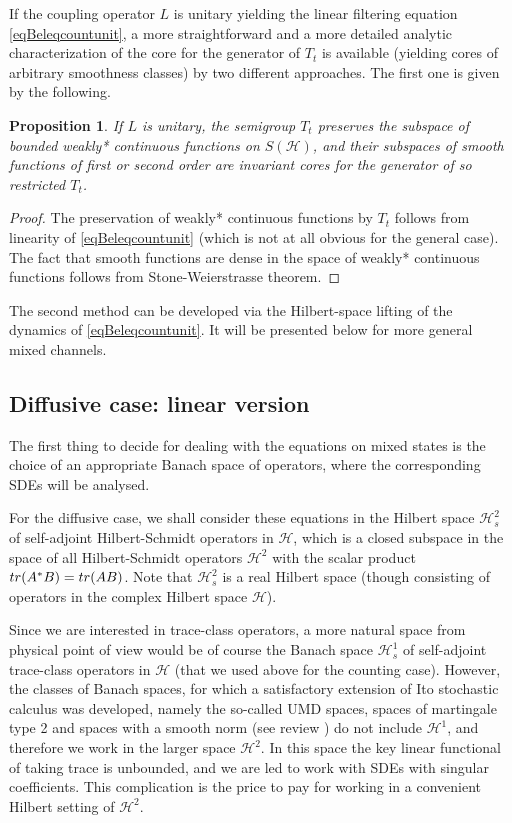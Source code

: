 \documentclass[10pt,a4paper]{amsart}
\def\HC{\mathcal{H}}
\def\tr{\rm{tr}}
\newtheorem{prop}{Proposition}[section]
\newtheorem{remark}{Remark}
\begin{document}
If the coupling operator $L$ is unitary yielding the linear filtering equation
\eqref{eqBeleqcountunit}, a more straightforward and a more detailed analytic
characterization of the core for the generator of $T_t$ is available (yielding
cores of arbitrary smoothness classes)
by two different approaches.
The first one is given by the following.

\begin{prop}
\label{JumpWellPDE2}
If $L$ is unitary, the semigroup  $T_t$ preserves the subspace of bounded weakly* continuous functions
on $S(\HC)$, and their subspaces of smooth functions of first or second order are invariant cores
for the generator of so restricted $T_t$.
\end{prop}

\begin{proof} The preservation of weakly* continuous functions by $T_t$ follows from linearity
of \eqref{eqBeleqcountunit} (which is not at all obvious for the general case). The fact that smooth
functions are dense in the space of weakly* continuous functions follows from Stone-Weierstrasse theorem.
\end{proof}

The second method can be developed via the Hilbert-space lifting of the dynamics of \eqref{eqBeleqcountunit}.
It will be presented below for more general mixed channels.


\subsection{Diffusive case: linear version}
\label{seclineq}

The first thing to decide for dealing with the equations on mixed states is the choice
of an appropriate Banach space of operators, where the corresponding SDEs will be analysed.

For the diffusive case, we shall consider these equations in the Hilbert space $\HC^2_s$ of self-adjoint Hilbert-Schmidt
operators in $\HC$, which is a closed subspace
in the space of all Hilbert-Schmidt operators $\HC^2$ with the scalar product
${\tr} (A^*B)={\tr} (AB)$. Note that $\HC^2_s$ is a real Hilbert space
(though consisting of operators in the complex Hilbert space $\HC$).

Since we are interested in trace-class operators, a more natural
space from physical point of view  would be of course the Banach space $\HC^1_s$ of self-adjoint
trace-class operators in $\HC$ (that we used above for the counting case).
However, the classes of Banach spaces,
for which a satisfactory extension of Ito stochastic calculus was developed,
namely the so-called UMD spaces, spaces of martingale type 2 and spaces with a smooth norm
(see review \cite{VanNeerven}) do not include $\HC^1$, and therefore we work in the larger space
$\HC^2$. In this space the key linear functional of taking trace is unbounded,
and we are led to work with SDEs with singular coefficients. This complication
is the price to pay for working in a convenient Hilbert setting of $\HC^2$.
\end{document}
